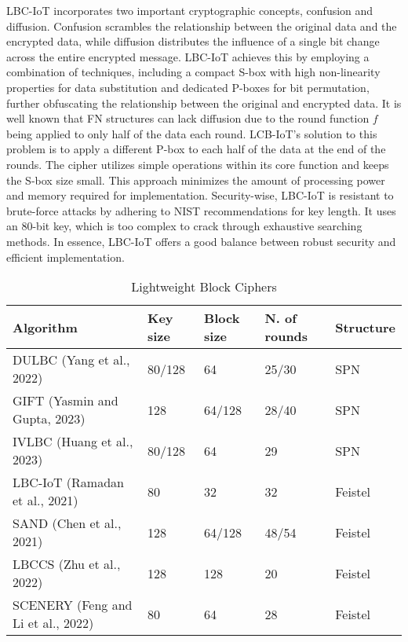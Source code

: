 \documentclass[conference]{IEEEtran}
\begin{document}
LBC-IoT incorporates two important cryptographic concepts, confusion and diffusion. Confusion scrambles the relationship between the original data and the encrypted data, while diffusion distributes the influence of a single bit change across the entire encrypted message. LBC-IoT achieves this by employing a combination of techniques, including a compact S-box with high non-linearity properties for data substitution and dedicated P-boxes for bit permutation, further obfuscating the relationship between the original and encrypted data. It is well known that FN structures can lack diffusion due to the round function $f$ being applied to only half of the data each round. LCB-IoT's solution to this problem is to apply a different P-box to each half of the data at the end of the rounds. The cipher utilizes simple operations within its core function and keeps the S-box size small. This approach minimizes the amount of processing power and memory required for implementation. Security-wise, LBC-IoT is resistant to brute-force attacks by adhering to NIST recommendations for key length. It uses an 80-bit key, which is too complex to crack through exhaustive searching methods. In essence, LBC-IoT offers a good balance between robust security and efficient implementation\cite{LBC-IoT}.

\begin{table*}[ht]
    \centering
    \caption{Lightweight Block Ciphers}
    \begin{tabular}{lllll} 
     \toprule
     Algorithm & Key size & Block size & N. of rounds & Structure \\ 
     \midrule
     DULBC (Yang et al., 2022) \cite{DULBC} & 80/128 & 64 & 25/30 & SPN \\
     GIFT (Yasmin and Gupta, 2023)\cite{GIFT}\cite{yasmin2023modified} & 128 & 64/128 & 28/40 & SPN \\
     IVLBC (Huang et al., 2023)\cite{IVLBC} & 80/128 & 64 & 29 & SPN \\
     LBC-IoT (Ramadan et al., 2021)\cite{LBC-IoT} & 80 & 32 & 32 & Feistel  \\
     SAND (Chen et al., 2021)\cite{SAND} & 128 & 64/128 & 48/54 & Feistel \\
     LBCCS (Zhu et al., 2022)\cite{LBCCS} & 128 & 128 & 20 & Feistel \\
     SCENERY (Feng and Li et al., 2022)\cite{SCENERY} & 80 & 64 & 28 & Feistel  \\
     \bottomrule
    \end{tabular}
    \label{table:ciphers}
\end{table*}
\end{document}
